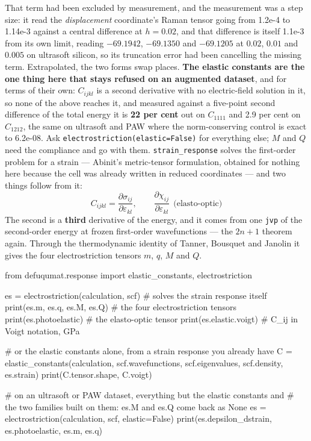 \documentclass[11pt,a4paper]{article}
\newcommand{\code}[1]{\texttt{\small #1}}
\begin{document}
That term had been excluded by measurement, and the measurement was a step
size: it read the \emph{displacement} coordinate's Raman tensor going from
1.2e-4 to 1.14e-3 against a central difference at $h = 0.02$, and that
difference is itself 1.1e-3 from its own limit, reading $-69.1942$, $-69.1350$
and $-69.1205$ at $0.02$, $0.01$ and $0.005$ on ultrasoft silicon, so its
truncation error had been cancelling the missing term. Extrapolated, the
two forms swap places. \textbf{The elastic constants are the one thing here
that stays refused on an augmented dataset}, and for terms of their own:
$C_{ijkl}$ is a second derivative with no electric-field solution in it, so
none of the above reaches it, and measured against a five-point second
difference of the total energy it is \textbf{22 per cent} out on $C_{1111}$ and
2.9 per cent on $C_{1212}$, the same on ultrasoft and PAW where the
norm-conserving control is exact to 6.2e-08. Ask
\code{electrostriction(elastic=False)} for everything else; $M$ and $Q$ need
the compliance and go with them.
\code{strain\_response} solves the first-order problem for a strain --- Abinit's
metric-tensor formulation, obtained for nothing here because the cell was
already written in reduced coordinates --- and two things follow from it:
\begin{equation*}
C_{ijkl} = \frac{\partial\sigma_{ij}}{\partial\varepsilon_{kl}},
\qquad
\frac{\partial\chi_{ij}}{\partial\varepsilon_{kl}}\ \ \text{(elasto-optic)}
\end{equation*}
The second is a \textbf{third} derivative of the energy, and it comes from one
\code{jvp} of the second-order energy at frozen first-order wavefunctions ---
the $2n{+}1$ theorem again. Through the thermodynamic identity of Tanner,
Bousquet and Janolin it gives the four electrostriction tensors $m$, $q$, $M$
and $Q$.

\begin{pycode}
from defuqumat.response import elastic_constants, electrostriction

es = electrostriction(calculation, scf)     # solves the strain response itself
print(es.m, es.q, es.M, es.Q)              # the four electrostriction tensors
print(es.photoelastic)                      # the elasto-optic tensor
print(es.elastic.voigt)                     # C_ij in Voigt notation, GPa

# or the elastic constants alone, from a strain response you already have
C = elastic_constants(calculation, scf.wavefunctions, scf.eigenvalues,
                      scf.density, es.strain)
print(C.tensor.shape, C.voigt)

# on an ultrasoft or PAW dataset, everything but the elastic constants and
# the two families built on them: es.M and es.Q come back as None
es = electrostriction(calculation, scf, elastic=False)
print(es.depsilon_dstrain, es.photoelastic, es.m, es.q)
\end{pycode}
\end{document}
